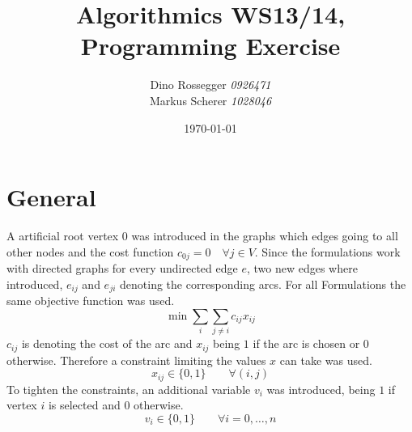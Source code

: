 \documentclass[a4paper]{article}
\title{Algorithmics WS13/14, Programming Exercise}
\author{Dino Rossegger \emph{0926471}\\ Markus Scherer \emph{1028046}}
\date{\today}
\numberwithin{equation}{section}
\begin{document}
\maketitle
\section{General}
A artificial root vertex $0$ was introduced in the graphs which edges going to all other nodes and the cost function $c_{0j}=0\quad \forall j\in V$. Since the formulations work with directed graphs for every undirected edge $e$, two new edges where introduced, $e_{ij}$ and $e_{ji}$ denoting the corresponding arcs.
For all Formulations the same objective function was used.
\begin{equation}
	\min{\sum_i \sum_{j\not=i} c_{ij}x_{ij}}
\end{equation} 
$c_{ij}$ is denoting the cost of the arc and $x_{ij}$ being $1$ if the arc is chosen or $0$ otherwise. 
Therefore a constraint limiting the values $x$ can take was used.
\begin{equation}
	x_{ij} \in \{0,1\} \qquad \forall (i,j)
\end{equation}
To tighten the constraints, an additional variable $v_i$ was introduced, being $1$ if vertex $i$ is selected and $0$ otherwise.
\begin{equation}
	v_i \in\{0,1\} \qquad \forall i=0,\dots,n
\end{equation}
\end{document}
